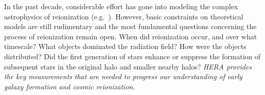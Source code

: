 \documentclass[preprint]{aastex}
\begin{document}
In the past decade, considerable effort has gone into modeling the complex astrophysics
of reionization 
(e.g.\ \citealt{santos_et_al2010,mesinger_et_al2011,wyithe_loeb2004}). However,
basic constraints on theoretical models are still rudimentary and the most
fundamental questions concerning the process of reionization remain open.
When did
reionization occur, and over what timescale?  What objects dominated the
radiation field? How were the objects distributed? 
Did the first generation of
stars enhance or suppress the formation of subsequent stars in the original
halo and smaller nearby halos? {\it HERA provides the key measurements 
that are needed to 
progress our understanding of early galaxy formation and
cosmic reionization.}
\end{document}
